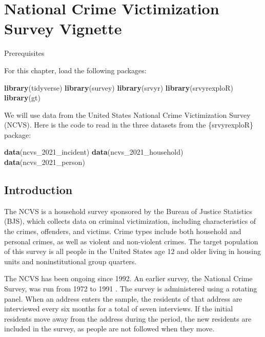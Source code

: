 \documentclass[
]{krantz}
\makeatletter
\newenvironment{Shaded}{\begin{snugshade}}{\end{snugshade}}
\newcommand{\FunctionTok}[1]{\textcolor[rgb]{0.27,0.27,0.27}{\textbf{#1}}}
\newcommand{\NormalTok}[1]{#1}
\newenvironment{kframe}{%
\medskip{}
\setlength{\fboxsep}{.8em}
 \def\at@end@of@kframe{}%
 \ifinner\ifhmode%
  \def\at@end@of@kframe{\end{minipage}}%
  \begin{minipage}{\columnwidth}%
 \fi\fi%
 \def\FrameCommand##1{\hskip\@totalleftmargin \hskip-\fboxsep
 \colorbox{shadecolor}{##1}\hskip-\fboxsep
     \hskip-\linewidth \hskip-\@totalleftmargin \hskip\columnwidth}%
 \MakeFramed {\advance\hsize-\width
   \@totalleftmargin\z@ \linewidth\hsize
   \@setminipage}}%
 {\par\unskip\endMakeFramed%
 \at@end@of@kframe}
\renewenvironment{Shaded}{\begin{kframe}}{\end{kframe}}
\makeatother
\begin{document}
\hypertarget{c13-ncvs-vignette}{%
\chapter{National Crime Victimization Survey Vignette}\label{c13-ncvs-vignette}}

\begin{prereqbox}{Prerequisites}

For this chapter, load the following packages:

\begin{Shaded}
\begin{Highlighting}[]
\FunctionTok{library}\NormalTok{(tidyverse)}
\FunctionTok{library}\NormalTok{(survey)}
\FunctionTok{library}\NormalTok{(srvyr)}
\FunctionTok{library}\NormalTok{(srvyrexploR)}
\FunctionTok{library}\NormalTok{(gt)}
\end{Highlighting}
\end{Shaded}

We will use data from the United States National Crime Victimization Survey (NCVS). Here is the code to read in the three datasets from the \{srvyrexploR\} package:

\begin{Shaded}
\begin{Highlighting}[]
\FunctionTok{data}\NormalTok{(ncvs\_2021\_incident)}
\FunctionTok{data}\NormalTok{(ncvs\_2021\_household)}
\FunctionTok{data}\NormalTok{(ncvs\_2021\_person)}
\end{Highlighting}
\end{Shaded}

\end{prereqbox}

\hypertarget{introduction-10}{%
\section{Introduction}\label{introduction-10}}

The NCVS is a household survey sponsored by the Bureau of Justice Statistics (BJS), which collects data on criminal victimization, including characteristics of the crimes, offenders, and victims. Crime types include both household and personal crimes, as well as violent and non-violent crimes. The target population of this survey is all people in the United States age 12 and older living in housing units and noninstitutional group quarters.

The NCVS has been ongoing since 1992. An earlier survey, the National Crime Survey, was run from 1972 to 1991 \citep{ncvs_tech_2016}. The survey is administered using a rotating panel. When an address enters the sample, the residents of that address are interviewed every six months for a total of seven interviews. If the initial residents move away from the address during the period, the new residents are included in the survey, as people are not followed when they move.
\end{document}
